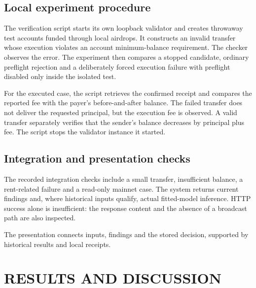\documentclass[12pt,a4paper,oneside]{report}
\begin{document}
\section{Local experiment procedure}
The verification script starts its own loopback validator and creates throwaway test accounts funded through local airdrops. It constructs an invalid transfer whose execution violates an account minimum-balance requirement. The checker observes the error. The experiment then compares a stopped candidate, ordinary preflight rejection and a deliberately forced execution failure with preflight disabled only inside the isolated test.

For the executed case, the script retrieves the confirmed receipt and compares the reported fee with the payer's before-and-after balance. The failed transfer does not deliver the requested principal, but the execution fee is observed. A valid transfer separately verifies that the sender's balance decreases by principal plus fee. The script stops the validator instance it started.
\section{Integration and presentation checks}
The recorded integration checks include a small transfer, insufficient balance, a rent-related failure and a read-only mainnet case. The system returns current findings and, where historical inputs qualify, actual fitted-model inference. HTTP success alone is insufficient: the response content and the absence of a broadcast path are also inspected.

The presentation connects inputs, findings and the stored decision, supported by historical results and local receipts.

\chapter{RESULTS AND DISCUSSION}
\end{document}
